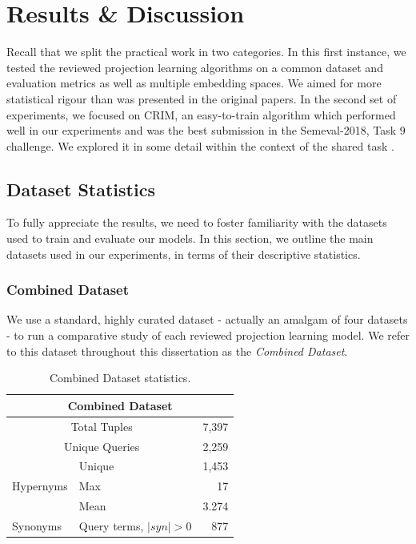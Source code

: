 \chapter{Results \& Discussion}
Recall that we split the practical work in two categories.  In this first instance, we tested the reviewed projection learning algorithms on a common dataset and evaluation metrics as well as multiple embedding spaces.  We aimed for more statistical rigour than was presented in the original papers.  In the second set of experiments, we focused on CRIM, an easy-to-train algorithm which performed well in our experiments and was the best submission in the Semeval-2018, Task 9 challenge.  We explored it in some detail within the context of the shared task \citep{camacho2018semeval}.  

\section{Dataset Statistics} \label{dataset_stats}
To fully appreciate the results, we need to foster familiarity with the datasets used to train and evaluate our models.  In this section, we outline the main datasets used in our experiments, in terms of their descriptive statistics.  

\subsection{Combined Dataset}
We use a standard, highly curated dataset - actually an amalgam of four datasets - to run a comparative study of each reviewed projection learning model.   We refer to this dataset throughout this dissertation as the \textit{Combined Dataset}.  
\begin{table}\centering
\begin{tabular}{@{}llr@{}}\toprule
\multicolumn{3}{c}{\textbf{Combined Dataset}} \\ \midrule
\multicolumn{2}{c}{Total Tuples} & 7,397\\
\multicolumn{2}{c}{Unique Queries} & 2,259\\ \midrule
\multirow{3}{*}{Hypernyms} & Unique & 1,453\\
& Max & 17\\
& Mean & 3.274\\
Synonyms & Query terms, $\vert syn \vert > 0$ & 877\\
\bottomrule
\end{tabular}
\caption{Combined Dataset statistics.}\label{tab:combined_dataset_stat}
\end{table}

